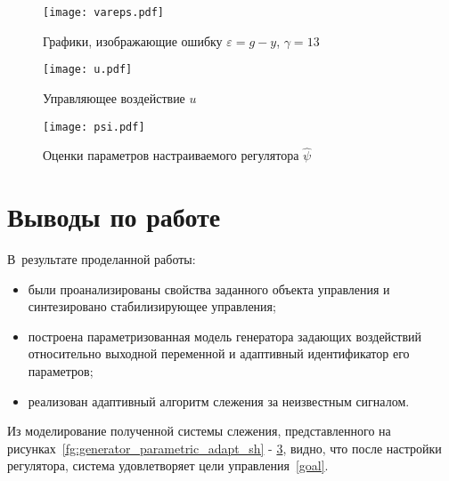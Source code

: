 \begin{figure}[h!]
	\centering
	\texttt{[image: vareps.pdf]}
	\caption{Графики, изображающие ошибку $\varepsilon = g - y$, $\gamma = 13$}
	\label{fg:fin_}
\end{figure}

\begin{figure}[h!]
	\centering
	\texttt{[image: u.pdf]}
	\caption{Управляющее воздействие $u$}
	\label{fg:fin_2}
\end{figure}

\clearpage
\begin{figure}[h!]
	\centering
	\texttt{[image: psi.pdf]}
	\caption{Оценки параметров настраиваемого регулятора $\hat\psi$}
	\label{fg:fin_3}
\end{figure}


\section{Выводы по работе}
В~результате проделанной работы:
\begin{itemize}
	\item были проанализированы свойства заданного объекта управления и синтезировано стабилизирующее управления; 
	\item построена параметризованная модель генератора задающих воздействий относительно выходной переменной и адаптивный идентификатор его параметров;
	\item реализован адаптивный алгоритм слежения за неизвестным сигналом.
\end{itemize}

Из моделирование полученной системы слежения, представленного на рисунках~\ref{fg:generator_parametric_adapt_sh} - \ref{fg:fin_3}, видно, что после настройки регулятора, система удовлетворяет цели управления~\eqref{goal}.
